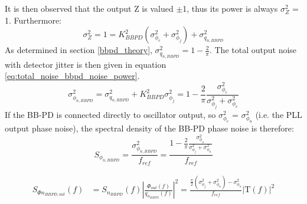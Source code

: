 	 It is then observed that the output Z is valued $\pm$1, thus its power is always $\sigma_Z^2$ = 1. Furthermore:
	\begin{equation}
	 	\sigma^2_{Z} = 1 = K_{BBPD}^2(\sigma^2_{\phi_e} +\sigma^2_{\phi_j})  + \sigma^2_{q_{n,BBPD}}
	\end{equation}
	 As determined in section \ref{bbpd_theory}, $\sigma^2_{q_{n,BBPD}} = 1 - \frac{2}{\pi}$. The total output noise with detector jitter is then given in equation \ref{eq:total_noise_bbpd_noise_power}.
			\begin{equation}\label{eq:total_noise_bbpd_noise_power}
				\sigma^2_{\phi_{n,BBPD}} =  \sigma^2_{q_{n,BBPD}} + K_{BBPD}^2\sigma^2_{\phi_j} =  1 - \frac{2}{\pi}\frac{\sigma^2_{\phi_e}}{\sigma^2_{\phi_j} + \sigma^2_{\phi_e}}
			\end{equation}
	If the BB-PD is connected directly to oscillator output, so $\sigma^2_{\phi_e}$ = $\sigma^2_{\phi_n}$ (i.e. the PLL output phase noise), the spectral density of the BB-PD phase noise is therefore:
		\begin{equation}
			S_{\phi_{n,BBPD}} = \frac{\sigma^2_{\phi_{n,BBPD}}}{f_{ref}} =  \frac{1 - \frac{2}{\pi}\frac{\sigma^2_{\phi_n}}{\sigma^2_{\phi_j} + \sigma^2_{\phi_n}}}{f_{ref}}
		\end{equation}

		\begin{align}\label{eq:out_psd_bbpd_pll3}
			S_{\Phi n_{BBPD,out}}(f) &= S_{n_{BBPD}}(f)\left|\frac{\Phi_{out}(f)}{q_{n_{BBPD}}(f)}\right|^2 = \frac{\frac{\pi}{2}(\sigma^2_{\phi_j} + \sigma^2_{\phi_n})-\sigma^2_{\phi_n}}{f_{ref}}\left|\mathrm{T}(f)\right|^2
		\end{align}



